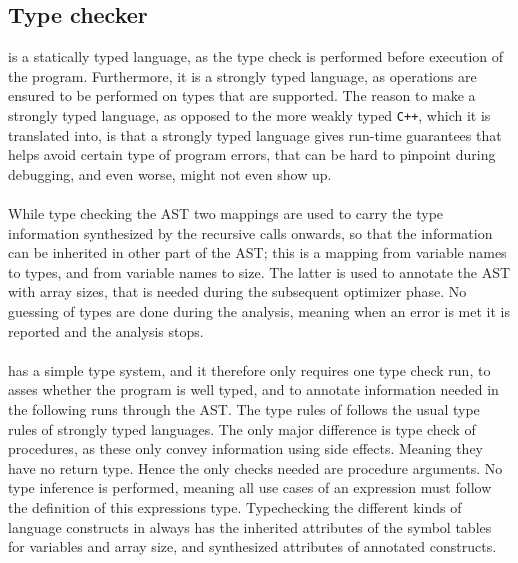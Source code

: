 \subsection{Type checker}
\lan is a statically typed language, as the type check is performed before execution of the program.
Furthermore, it is a strongly typed language, as operations are ensured to be performed on
types that are supported. The reason to make \lan a strongly typed language, as opposed to
the more weakly typed \texttt{C++}, which it is translated into, is that a strongly typed
language gives run-time guarantees that helps avoid certain type of program errors, that can be
hard to pinpoint during debugging, and even worse, might not even show up.
\\
\\
While type checking the AST two mappings are used to carry the type information synthesized by the
recursive calls onwards, so that the information can be inherited in other part of the AST; this
is a mapping from variable names to types, and from variable names to size. The latter is used
to annotate the AST with array sizes, that is needed during the subsequent optimizer phase.
No guessing of types are done during the analysis, meaning when an error is met it is reported
and the analysis stops.
\\
\\
\lan has a simple type system, and it therefore only requires one type check run, to asses whether
the program is well typed, and to annotate information needed in the following runs through the AST.
The type rules of \lan follows the usual type rules of strongly typed languages.
The only major difference is type check of procedures,
as these only convey information using side effects. Meaning they have no return type. Hence the
only checks needed are procedure arguments. No type inference is performed, meaning all use cases
of an expression must follow the definition of this expressions type.
Typechecking the different kinds of language constructs
in \lan always has the inherited attributes of the symbol tables for variables and array size,
and synthesized attributes of annotated constructs.



